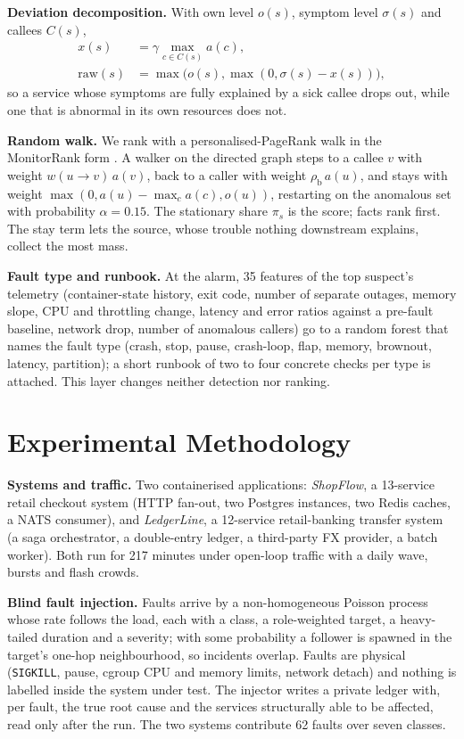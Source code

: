 \documentclass[journal]{IEEEtran}
\begin{document}
\textbf{Deviation decomposition.} With own level $o(s)$, symptom level $\sigma(s)$ and callees $C(s)$,
\begin{align}
x(s)&=\gamma\max_{c\in C(s)}a(c),\nonumber\\
\mathrm{raw}(s)&=\max\bigl(o(s),\max(0,\sigma(s)-x(s))\bigr),
\end{align}
so a service whose symptoms are fully explained by a sick callee drops out, while one that is abnormal in its own resources does not.

\textbf{Random walk.} We rank with a personalised-PageRank walk in the MonitorRank form \cite{kim2013monitorrank}. A walker on the
directed graph steps to a callee $v$ with weight $w(u\!\to\!v)\,a(v)$, back to a caller with weight $\rho_{\mathrm b}\,a(u)$, and stays with
weight $\max(0,a(u)-\max_{c}a(c),o(u))$, restarting on the anomalous set with probability $\alpha{=}0.15$. The stationary share
$\pi_s$ is the score; facts rank first. The stay term lets the source, whose trouble nothing downstream explains, collect the most mass.

\textbf{Fault type and runbook.} At the alarm, 35 features of the top suspect's telemetry (container-state history, exit code, number of
separate outages, memory slope, CPU and throttling change, latency and error ratios against a pre-fault baseline, network drop,
number of anomalous callers) go to a random forest \cite{breiman2001rf} that names the fault type (crash, stop, pause, crash-loop, flap,
memory, brownout, latency, partition); a short runbook of two to four concrete checks per type is attached. This layer changes
neither detection nor ranking.

\section{Experimental Methodology}
\label{sec:method}
\textbf{Systems and traffic.} Two containerised applications: \emph{ShopFlow}, a 13-service retail checkout system (HTTP fan-out, two
Postgres instances, two Redis caches, a NATS consumer), and \emph{LedgerLine}, a 12-service retail-banking transfer system (a saga
orchestrator, a double-entry ledger, a third-party FX provider, a batch worker). Both run for 217 minutes under open-loop traffic with a
daily wave, bursts and flash crowds.

\textbf{Blind fault injection.} Faults arrive by a non-homogeneous Poisson process whose rate follows the load, each with a class, a
role-weighted target, a heavy-tailed duration and a severity; with some probability a follower is spawned in the target's one-hop
neighbourhood, so incidents overlap. Faults are physical (\texttt{SIGKILL}, pause, cgroup CPU and memory limits, network detach) and
nothing is labelled inside the system under test. The injector writes a private ledger with, per fault, the true root cause and the
services structurally able to be affected, read only after the run. The two systems contribute 62 faults over seven classes.
\end{document}
